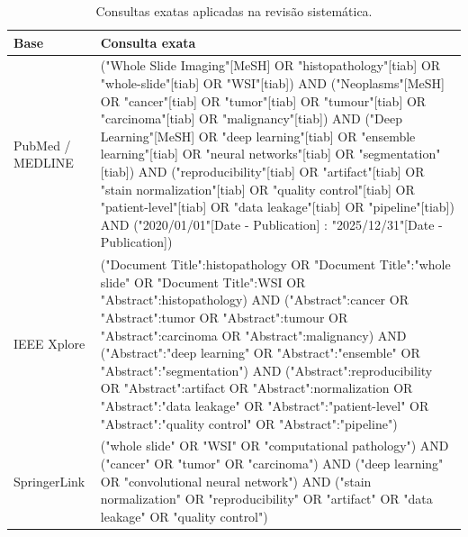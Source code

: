\begin{table}[!htb]
\centering
\caption{Consultas exatas aplicadas na revisão sistemática.}
\label{tab:revisao_sistematica_consultas}
\scriptsize
\setlength{\tabcolsep}{4pt}
\renewcommand{\arraystretch}{1.12}
\begin{tabular}{>{\raggedright\arraybackslash}p{2.8cm}>{\raggedright\arraybackslash}p{10.45cm}}
\toprule
Base & Consulta exata \\
\midrule
PubMed / MEDLINE & ("Whole Slide Imaging"[MeSH] OR "histopathology"[tiab] OR "whole-slide"[tiab] OR "WSI"[tiab]) AND ("Neoplasms"[MeSH] OR "cancer"[tiab] OR "tumor"[tiab] OR "tumour"[tiab] OR "carcinoma"[tiab] OR "malignancy"[tiab]) AND ("Deep Learning"[MeSH] OR "deep learning"[tiab] OR "ensemble learning"[tiab] OR "neural networks"[tiab] OR "segmentation"[tiab]) AND ("reproducibility"[tiab] OR "artifact"[tiab] OR "stain normalization"[tiab] OR "quality control"[tiab] OR "patient-level"[tiab] OR "data leakage"[tiab] OR "pipeline"[tiab]) AND ("2020/01/01"[Date - Publication] : "2025/12/31"[Date - Publication]) \\[0.35em]
IEEE Xplore & ("Document Title":histopathology OR "Document Title":"whole slide" OR "Document Title":WSI OR "Abstract":histopathology) AND ("Abstract":cancer OR "Abstract":tumor OR "Abstract":tumour OR "Abstract":carcinoma OR "Abstract":malignancy) AND ("Abstract":"deep learning" OR "Abstract":"ensemble" OR "Abstract":"segmentation") AND ("Abstract":reproducibility OR "Abstract":artifact OR "Abstract":normalization OR "Abstract":"data leakage" OR "Abstract":"patient-level" OR "Abstract":"quality control" OR "Abstract":"pipeline") \\[0.35em]
SpringerLink & ("whole slide" OR "WSI" OR "computational pathology") AND ("cancer" OR "tumor" OR "carcinoma") AND ("deep learning" OR "convolutional neural network") AND ("stain normalization" OR "reproducibility" OR "artifact" OR "data leakage" OR "quality control") \\[0.35em]
\bottomrule
\end{tabular}
\normalsize
\end{table}
